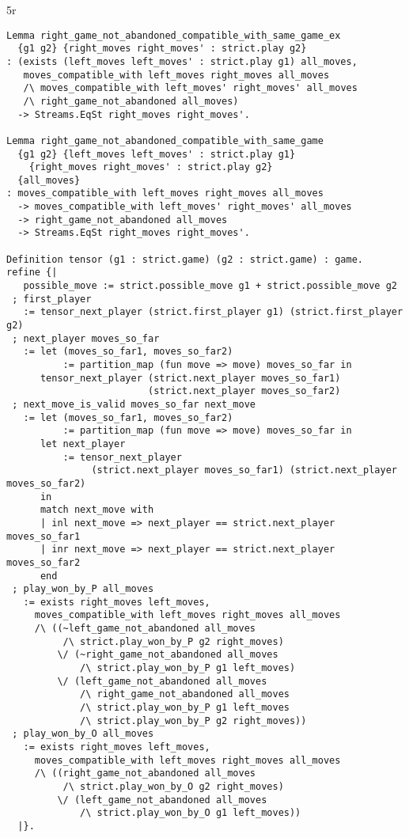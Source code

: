 5r\documentclass{article}
\theoremstyle{definition}
\begin{document}
\begin{verbatim}
Lemma right_game_not_abandoned_compatible_with_same_game_ex
  {g1 g2} {right_moves right_moves' : strict.play g2}
: (exists (left_moves left_moves' : strict.play g1) all_moves,
   moves_compatible_with left_moves right_moves all_moves
   /\ moves_compatible_with left_moves' right_moves' all_moves
   /\ right_game_not_abandoned all_moves)
  -> Streams.EqSt right_moves right_moves'.
  
Lemma right_game_not_abandoned_compatible_with_same_game
  {g1 g2} {left_moves left_moves' : strict.play g1} 
    {right_moves right_moves' : strict.play g2}
  {all_moves}
: moves_compatible_with left_moves right_moves all_moves
  -> moves_compatible_with left_moves' right_moves' all_moves
  -> right_game_not_abandoned all_moves
  -> Streams.EqSt right_moves right_moves'.
  
Definition tensor (g1 : strict.game) (g2 : strict.game) : game.
refine {|
   possible_move := strict.possible_move g1 + strict.possible_move g2
 ; first_player
   := tensor_next_player (strict.first_player g1) (strict.first_player g2)
 ; next_player moves_so_far
   := let (moves_so_far1, moves_so_far2)
          := partition_map (fun move => move) moves_so_far in
      tensor_next_player (strict.next_player moves_so_far1)
                         (strict.next_player moves_so_far2)
 ; next_move_is_valid moves_so_far next_move
   := let (moves_so_far1, moves_so_far2)
          := partition_map (fun move => move) moves_so_far in
      let next_player
          := tensor_next_player
               (strict.next_player moves_so_far1) (strict.next_player moves_so_far2)
      in
      match next_move with
      | inl next_move => next_player == strict.next_player moves_so_far1
      | inr next_move => next_player == strict.next_player moves_so_far2
      end
 ; play_won_by_P all_moves
   := exists right_moves left_moves,
     moves_compatible_with left_moves right_moves all_moves
     /\ ((~left_game_not_abandoned all_moves
          /\ strict.play_won_by_P g2 right_moves)
         \/ (~right_game_not_abandoned all_moves
             /\ strict.play_won_by_P g1 left_moves)
         \/ (left_game_not_abandoned all_moves
             /\ right_game_not_abandoned all_moves
             /\ strict.play_won_by_P g1 left_moves
             /\ strict.play_won_by_P g2 right_moves))
 ; play_won_by_O all_moves
   := exists right_moves left_moves,
     moves_compatible_with left_moves right_moves all_moves
     /\ ((right_game_not_abandoned all_moves
          /\ strict.play_won_by_O g2 right_moves)
         \/ (left_game_not_abandoned all_moves
             /\ strict.play_won_by_O g1 left_moves))
  |}.
\end{verbatim}
\end{document}
